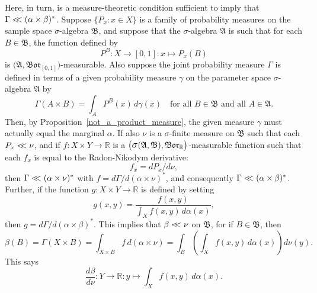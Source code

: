 \documentclass[
twoside=true,
paper=letter,
fontsize=9pt,
pagesize=auto,
leqno,
openany,
headsepline,
overfullrule,
]{scrbook}
\theoremstyle{plain}
\theoremstyle{plain}
\theoremstyle{definition}
\theoremstyle{bfnoteitalic}
\theoremstyle{bfnoteroman}
\newcommand{\sigalg}[1]{\mathfrak{#1}}
\newcommand{\borel}{\mathfrak{Bor}}
\newcommand{\sagb}{\mathop{\hbox{\large{$\sigma$}}}\nolimits}
\newcommand{\textsigma}{\hbox{\large{$\sigma$}}\kern-1pt}
\newcommand{\R}{\mathbb{R}}
\newcommand{\sigmaalgebra}{\sigalg{A}}
\newcommand{\sigmaalgebraii}{\sigalg{B}}
\newcommand{\productsig}[2]{\sagb(#1,#2)}
\newcommand{\funcf}{f}
\newcommand{\funcg}{g}
\newcommand{\function}{f}
\newcommand{\functionii}{g}
\newcommand{\measurespace}{X}
\newcommand{\measurespaceii}{Y}
\newcommand{\mspaceelt}{x}
\newcommand{\abscont}{\mathrel{< \kern-3.5pt <}}
\newcommand{\measnu}{\nu}
\newcommand{\setii}{B}
\newcommand{\pspace}{\measurespace}%
\newcommand{\sspace}{\measurespaceii}%
\newcommand{\pspaceset}{A}
\newcommand{\sspaceset}{B}
\newcommand{\pspaceelt}{x}
\newcommand{\sspaceelt}{y}
\newcommand{\sspacesig}{\sigalg{B}}
\newcommand{\pspacesig}{\sigalg{A}}
\newcommand{\joint}{\Gamma}%
\newcommand{\measonprod}{\Gamma}%
\newcommand{\marginalone}{\alpha}%
\newcommand{\marginaltwo}{\beta}%
\newcommand{\prior}{\marginalone}
\newcommand{\predictive}{\marginaltwo}
\newcommand{\wouldbeprior}{\gamma}
\begin{document}
Here, in turn, is a measure-theoretic condition sufficient to imply that
$\measonprod\abscont (\marginalone\times\marginaltwo)^*$.
Suppose
$\{ P_\mspaceelt :\mspaceelt\in\measurespace \}$
is a family of probability measures on the sample space \textsigma-algebra
$\sigmaalgebraii$,
and suppose that the \textsigma\hyp{}algebra $\sigmaalgebra$ is such that for each
$\setii\in\sigmaalgebraii$, the function defined by
\[
P^\setii
:\measurespace \to [0,1]
:\mspaceelt \mapsto P_\mspaceelt(\setii)
\]
is $\bigl(\sigmaalgebra,\borel_{[0,1]}\bigr)$\hyp{}measurable.
Also suppose the joint probability measure $\joint$  is defined in terms of
a given probability measure $\wouldbeprior$ on the parameter space \textsigma-algebra
$\pspacesig$ by
\[
\measonprod(\pspaceset\times\sspaceset)
=
\int_\pspaceset P^\sspaceset(\pspaceelt)
\, d\wouldbeprior(\pspaceelt)
\quad
\text{for all $\sspaceset\in\sspacesig$ and all $\pspaceset \in \pspacesig$.}
\]
Then, by Proposition~\ref{not_a_product_measure}, the given measure $\wouldbeprior$ must actually equal the marginal
$\prior$.
If also $\measnu$ is a \textsigma-finite measure on $\sspacesig$
such that each
$P_\pspaceelt\abscont \measnu$, and if
$\funcf : \pspace\times\sspace\to\R$ is a
$\bigl(\productsig{\pspacesig}{\sspacesig},\borel_\R\bigr)$\hyp{}measurable function
such that each $\funcf_\pspaceelt$ is equal to the Radon-Nikodym derivative:
\begin{equation}\label{as_density}
\function_\pspaceelt
=
d P_\pspaceelt/d\measnu,
\end{equation}
then
$\joint \abscont (\prior \times\measnu)^*$
with
$\function
=
d\measonprod/d(\prior \times\measnu)^*$,
and consequently
$\measonprod\abscont (\prior\times\predictive)^*$.
Further, if the function
$\funcg: \pspace\times\sspace\to\R$ is defined by setting
\[\functionii(\pspaceelt,\sspaceelt)
=
\frac
{\function(\pspaceelt,\sspaceelt)}
{\int_\pspace \function(\pspaceelt,\sspaceelt)\,
d\prior(\pspaceelt)},
\]
then
$\functionii
=
d\measonprod/d(\prior\times\predictive)^*$.
This implies that $\predictive \abscont \measnu$ on $\sspacesig$, for if $\sspaceset\in\sspacesig$, then
\[
\predictive(\sspaceset)
= \measonprod(\pspace \times \sspaceset)
= \int_{\pspace \times \sspaceset} \function \, d(\prior\times\measnu)
= \int_\sspaceset\left( \int_\pspace \function(\pspaceelt, \sspaceelt)\,d\prior(x)\right) d\measnu(\sspaceelt).
\]
This says
\[
\frac{d\predictive}{d\measnu}:
\sspace\to\R:
\sspaceelt\mapsto \int_\pspace \function(\pspaceelt,\sspaceelt)\,d\prior(x).
\]
\end{document}
